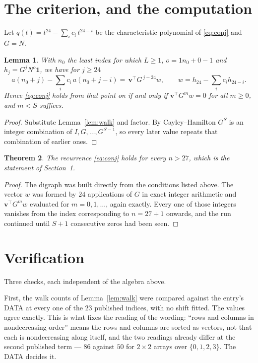 \documentclass[11pt,a4paper]{article}
\theoremstyle{plain}
\newtheorem{theorem}{Theorem}
\newtheorem{lemma}[theorem]{Lemma}
\theoremstyle{definition}
\begin{document}
\section{The criterion, and the computation}

Let $q(t)=t^{24}-\sum_i c_i\,t^{24-i}$ be the characteristic polynomial of
\eqref{eq:conj} and $G=N$.

\begin{lemma}\label{lem:crit}
With $n_0$ the least index for which $L\ge1$, $o=1n_0+0-1$ and
$h_j=G^{j}N^{o}\mathbf{1}$, we have for $j\ge24$
\[
a(n_0+j)-\sum_i c_i\,a(n_0+j-i)=\,\mathbf{v}^{\!\top}G^{\,j-24}w,
\qquad w=h_{24}-\sum_i c_ih_{24-i} .
\]
Hence \eqref{eq:conj} holds from that point on if and only if
$\mathbf{v}^{\!\top}G^{m}w=0$ for all $m\ge0$, and $m<S$ suffices.
\end{lemma}

\begin{proof}
Substitute Lemma~\ref{lem:walk} and factor. By Cayley--Hamilton $G^{S}$ is an integer
combination of $I,G,\dots,G^{S-1}$, so every later value repeats that combination of
earlier ones.
\end{proof}

\begin{theorem}
The recurrence \eqref{eq:conj} holds for every $n>27$, which is the statement of
Section~1.
\end{theorem}

\begin{proof}
The digraph was built directly from the conditions listed above. The vector $w$ was formed by
$24$ applications of $G$ in exact integer arithmetic and $\mathbf{v}^{\!\top}G^{m}w$
evaluated for $m=0,1,\dots$, again exactly. Every one of those integers vanishes from the
index corresponding to $n=27+1$ onwards, and the run continued until $S+1$ consecutive
zeros had been seen.
\end{proof}

\section{Verification}

Three checks, each independent of the algebra above.

First, the walk counts of Lemma~\ref{lem:walk} were compared against the entry's DATA at
every one of the $23$ published indices, with no shift fitted. The values agree exactly.
This is what fixes the reading of the wording: ``rows and columns in nondecreasing order''
means the rows and columns are sorted as vectors, not that each is nondecreasing along
itself, and the two readings already differ at the second published term --- $86$ against
$50$ for $2\times2$ arrays over $\{0,1,2,3\}$. The DATA decides it.
\end{document}
